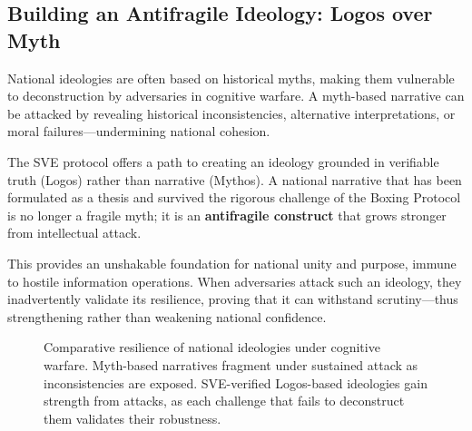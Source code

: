 \documentclass[11pt,a4paper]{article}
\begin{document}
\subsection{Building an Antifragile Ideology: Logos over Myth}
National ideologies are often based on historical myths, making them vulnerable to deconstruction by adversaries in cognitive warfare. A myth-based narrative can be attacked by revealing historical inconsistencies, alternative interpretations, or moral failures—undermining national cohesion.

The SVE protocol offers a path to creating an ideology grounded in verifiable truth (Logos) rather than narrative (Mythos). A national narrative that has been formulated as a thesis and survived the rigorous challenge of the Boxing Protocol is no longer a fragile myth; it is an \textbf{antifragile construct} that grows stronger from intellectual attack.

This provides an unshakable foundation for national unity and purpose, immune to hostile information operations. When adversaries attack such an ideology, they inadvertently validate its resilience, proving that it can withstand scrutiny—thus strengthening rather than weakening national confidence.

\begin{figure}[h!]
\centering
{}
\caption{Comparative resilience of national ideologies under cognitive warfare. Myth-based narratives fragment under sustained attack as inconsistencies are exposed. SVE-verified Logos-based ideologies gain strength from attacks, as each challenge that fails to deconstruct them validates their robustness.}
\label{fig:ideology_resilience}
\end{figure}
\end{document}

